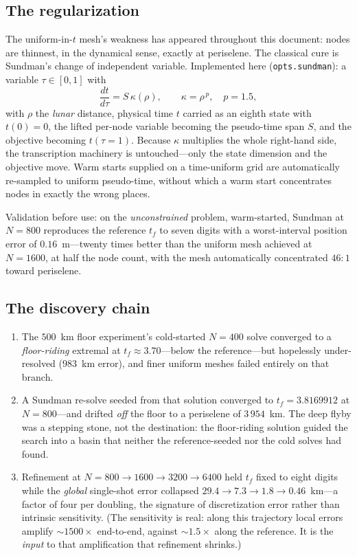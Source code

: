 \documentclass[11pt]{article}
\newcommand{\code}[1]{\texttt{#1}}
\begin{document}
\subsection{The regularization}

The uniform-in-$t$ mesh's weakness has appeared throughout this document: nodes
are thinnest, in the dynamical sense, exactly at periselene. The classical cure
is Sundman's change of independent variable. Implemented here
(\code{opts.sundman}): a variable $\tau \in [0,1]$ with
\[
  \frac{dt}{d\tau} = S\,\kappa(\rho), \qquad \kappa = \rho^{\,p},\quad p = 1.5,
\]
with $\rho$ the \emph{lunar} distance, physical time $t$ carried as an eighth
state with $t(0) = 0$, the lifted per-node variable becoming the pseudo-time
span $S$, and the objective becoming $t(\tau{=}1)$. Because $\kappa$ multiplies
the whole right-hand side, the transcription machinery is untouched---only the
state dimension and the objective move. Warm starts supplied on a time-uniform
grid are automatically re-sampled to uniform pseudo-time, without which a warm
start concentrates nodes in exactly the wrong places.

Validation before use: on the \emph{unconstrained} problem, warm-started,
Sundman at $N = 800$ reproduces the reference $t_f$ to seven digits with a
worst-interval position error of $0.16$~m---twenty times better than the
uniform mesh achieved at $N = 1600$, at half the node count, with the mesh
automatically concentrated $46{:}1$ toward periselene.

\subsection{The discovery chain}

\begin{enumerate}
  \item The $500$~km floor experiment's cold-started $N = 400$ solve converged
        to a \emph{floor-riding} extremal at $t_f \approx 3.70$---below the
        reference---but hopelessly under-resolved ($983$~km error), and finer
        uniform meshes failed entirely on that branch.
  \item A Sundman re-solve seeded from that solution converged to
        $t_f = 3.8169912$ at $N = 800$---and drifted \emph{off} the floor to a
        periselene of $3\,954$~km. The deep flyby was a stepping stone, not the
        destination: the floor-riding solution guided the search into a basin
        that neither the reference-seeded nor the cold solves had found.
  \item Refinement at $N = 800 \to 1600 \to 3200 \to 6400$ held $t_f$ fixed to
        eight digits while the \emph{global} single-shot error collapsed
        $29.4 \to 7.3 \to 1.8 \to 0.46$~km---a factor of four per doubling, the
        signature of discretization error rather than intrinsic sensitivity.
        (The sensitivity is real: along this trajectory local errors amplify
        ${\sim}1500\times$ end-to-end, against ${\sim}1.5\times$ along the
        reference. It is the \emph{input} to that amplification that
        refinement shrinks.)
\end{enumerate}
\end{document}
